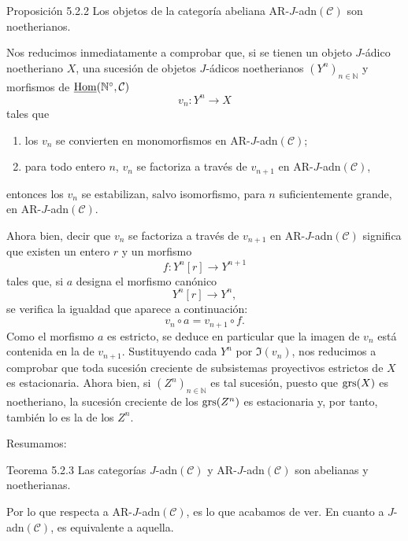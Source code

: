 \begin{statement}{Proposición 5.2.2}
Los objetos de la categoría abeliana AR-\(J\)-adn\((\mathcal C)\) son noetherianos.
\end{statement}

\begin{prooftext}
Nos reducimos inmediatamente a comprobar que, si se tienen un objeto \(J\)-ádico noetheriano \(X\), una sucesión de objetos \(J\)-ádicos noetherianos \((Y^n)_{n\in\mathbb N}\) y morfismos de \(\underline{\operatorname{Hom}}(\mathbb N^\circ,\mathcal C)\)
\[
v_n:Y^n\longrightarrow X
\]
tales que
\begin{enumerate}[label=\textup{(\roman*)}]
\item los \(v_n\) se convierten en monomorfismos en AR-\(J\)-adn\((\mathcal C)\);
\item para todo entero \(n\), \(v_n\) se factoriza a través de \(v_{n+1}\) en AR-\(J\)-adn\((\mathcal C)\),
\end{enumerate}
entonces los \(v_n\) se estabilizan, salvo isomorfismo, para \(n\) suficientemente grande, en AR-\(J\)-adn\((\mathcal C)\).

Ahora bien, decir que \(v_n\) se factoriza a través de \(v_{n+1}\) en AR-\(J\)-adn\((\mathcal C)\) significa que existen un entero \(r\) y un morfismo
\[
f:Y^n[r]\longrightarrow Y^{n+1}
\]
tales que, si \(a\) designa el morfismo canónico
\[
Y^n[r]\longrightarrow Y^n,
\]
se verifica la igualdad que aparece a continuación:
\[
v_n\circ a=v_{n+1}\circ f .
\]
Como el morfismo \(a\) es estricto, se deduce en particular que la imagen de \(v_n\) está contenida en la de \(v_{n+1}\). Sustituyendo cada \(Y^n\) por \(\Im(v_n)\), nos reducimos a comprobar que toda sucesión creciente de subsistemas proyectivos estrictos de \(X\) es estacionaria. Ahora bien, si \((Z^n)_{n\in\mathbb N}\) es tal sucesión, puesto que \(\operatorname{grs}(X)\) es noetheriano, la sucesión creciente de los \(\operatorname{grs}(Z^n)\) es estacionaria y, por tanto, también lo es la de los \(Z^n\).
\end{prooftext}

Resumamos:

\begin{statement}{Teorema 5.2.3}
Las categorías \(J\)-adn\((\mathcal C)\) y AR-\(J\)-adn\((\mathcal C)\) son abelianas y noetherianas.
\end{statement}

Por lo que respecta a AR-\(J\)-adn\((\mathcal C)\), es lo que acabamos de ver. En cuanto a \(J\)-adn\((\mathcal C)\), es equivalente a aquella.
